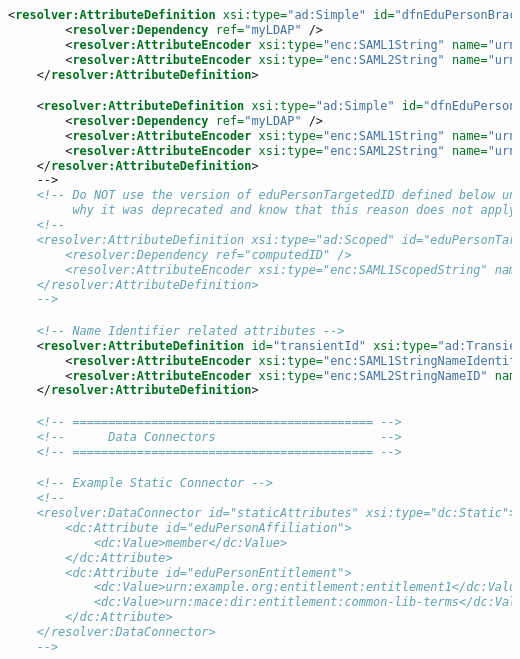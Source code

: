 \begin{lstlisting}[language=xml]
    <resolver:AttributeDefinition xsi:type="ad:Simple" id="dfnEduPersonBrachAndType" sourceAttributeID="dfnEduPersonBrachAndType">
        <resolver:Dependency ref="myLDAP" />
        <resolver:AttributeEncoder xsi:type="enc:SAML1String" name="urn:mace:dir:attribute-def:dfnEduPersonBrachAndType" />
        <resolver:AttributeEncoder xsi:type="enc:SAML2String" name="urn:oid:1.3.6.1.4.1.22177.400.1.1.3.10" friendlyName="dfnEduPersonBrachAndType" />
    </resolver:AttributeDefinition>

    <resolver:AttributeDefinition xsi:type="ad:Simple" id="dfnEduPersonFeaturesOfStudy" sourceAttributeID="dfnEduPersonFeaturesOfStudy">
        <resolver:Dependency ref="myLDAP" />
        <resolver:AttributeEncoder xsi:type="enc:SAML1String" name="urn:mace:dir:attribute-def:dfnEduPersonFeaturesOfStudy" />
        <resolver:AttributeEncoder xsi:type="enc:SAML2String" name="urn:oid:1.3.6.1.4.1.22177.400.1.1.3.11" friendlyName="dfnEduPersonFeaturesOfStudy" />
    </resolver:AttributeDefinition>
    -->
    <!-- Do NOT use the version of eduPersonTargetedID defined below unless you understand 
         why it was deprecated and know that this reason does not apply to you. -->
    <!--
    <resolver:AttributeDefinition xsi:type="ad:Scoped" id="eduPersonTargetedID.old" scope="shib.lan" sourceAttributeID="computedID">
        <resolver:Dependency ref="computedID" />
        <resolver:AttributeEncoder xsi:type="enc:SAML1ScopedString" name="urn:mace:dir:attribute-def:eduPersonTargetedID" />
    </resolver:AttributeDefinition>
    -->

    <!-- Name Identifier related attributes -->
    <resolver:AttributeDefinition id="transientId" xsi:type="ad:TransientId">
        <resolver:AttributeEncoder xsi:type="enc:SAML1StringNameIdentifier" nameFormat="urn:mace:shibboleth:1.0:nameIdentifier"/>
        <resolver:AttributeEncoder xsi:type="enc:SAML2StringNameID" nameFormat="urn:oasis:names:tc:SAML:2.0:nameid-format:transient"/>
    </resolver:AttributeDefinition>

    <!-- ========================================== -->
    <!--      Data Connectors                       -->
    <!-- ========================================== -->

    <!-- Example Static Connector -->
    <!--
    <resolver:DataConnector id="staticAttributes" xsi:type="dc:Static">
        <dc:Attribute id="eduPersonAffiliation">
            <dc:Value>member</dc:Value>
        </dc:Attribute>
        <dc:Attribute id="eduPersonEntitlement">
            <dc:Value>urn:example.org:entitlement:entitlement1</dc:Value>
            <dc:Value>urn:mace:dir:entitlement:common-lib-terms</dc:Value>
        </dc:Attribute>
    </resolver:DataConnector>
    -->


\end{lstlisting}
